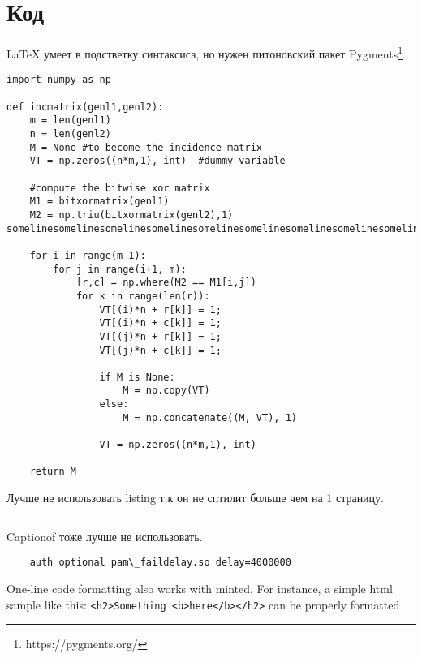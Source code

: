 \section{Код}

\LaTeX{} умеет в подстветку синтаксиса,
но нужен питоновский пакет Pygments\footnote{https://pygments.org/}.

\begin{verbatim}
import numpy as np
    
def incmatrix(genl1,genl2):
    m = len(genl1)
    n = len(genl2)
    M = None #to become the incidence matrix
    VT = np.zeros((n*m,1), int)  #dummy variable
    
    #compute the bitwise xor matrix
    M1 = bitxormatrix(genl1)
    M2 = np.triu(bitxormatrix(genl2),1) 
somelinesomelinesomelinesomelinesomelinesomelinesomelinesomelinesomelinesomeline,somelinesomelinesomelinesomelinesomelinesomelinesomelinesomelinesomelinesomeline

    for i in range(m-1):
        for j in range(i+1, m):
            [r,c] = np.where(M2 == M1[i,j])
            for k in range(len(r)):
                VT[(i)*n + r[k]] = 1;
                VT[(i)*n + c[k]] = 1;
                VT[(j)*n + r[k]] = 1;
                VT[(j)*n + c[k]] = 1;
                
                if M is None:
                    M = np.copy(VT)
                else:
                    M = np.concatenate((M, VT), 1)
                
                VT = np.zeros((n*m,1), int)
    
    return M
\end{verbatim}

Лучше не использовать listing т.к он не сптилит больше чем на 1 страницу.
\begin{listing}[H]
 \caption{example.c}\label{lst:example}
 \inputminted{c}{inc/example.c}
\end{listing}

Captionof тоже лучше не использовать.
\begin{verbatim}
    auth optional pam\_faildelay.so delay=4000000
\end{verbatim}

One-line code formatting also works with minted. For instance, a simple html
sample like this:
\texttt{<h2>Something <b>here</b></h2>}
can be properly
formatted
